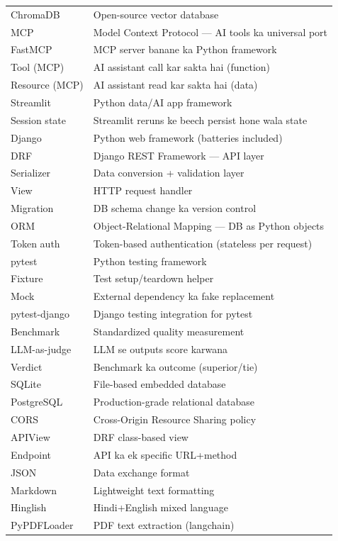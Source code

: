 \begin{longtable}{p{4.5cm} p{9.5cm}}
ChromaDB & Open-source vector database \\
MCP & Model Context Protocol --- AI tools ka universal port \\
FastMCP & MCP server banane ka Python framework \\
Tool (MCP) & AI assistant call kar sakta hai (function) \\
Resource (MCP) & AI assistant read kar sakta hai (data) \\
Streamlit & Python data/AI app framework \\
Session state & Streamlit reruns ke beech persist hone wala state \\
Django & Python web framework (batteries included) \\
DRF & Django REST Framework --- API layer \\
Serializer & Data conversion + validation layer \\
View & HTTP request handler \\
Migration & DB schema change ka version control \\
ORM & Object-Relational Mapping --- DB as Python objects \\
Token auth & Token-based authentication (stateless per request) \\
pytest & Python testing framework \\
Fixture & Test setup/teardown helper \\
Mock & External dependency ka fake replacement \\
pytest-django & Django testing integration for pytest \\
Benchmark & Standardized quality measurement \\
LLM-as-judge & LLM se outputs score karwana \\
Verdict & Benchmark ka outcome (superior/tie) \\
SQLite & File-based embedded database \\
PostgreSQL & Production-grade relational database \\
CORS & Cross-Origin Resource Sharing policy \\
APIView & DRF class-based view \\
Endpoint & API ka ek specific URL+method \\
JSON & Data exchange format \\
Markdown & Lightweight text formatting \\
Hinglish & Hindi+English mixed language \\
PyPDFLoader & PDF text extraction (langchain) \\

\end{longtable}
